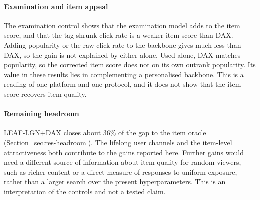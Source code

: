 \paragraph{Examination and item appeal} The examination control shows that the examination model adds to the item score, and that the
tag-shrunk click rate is a weaker item score than DAX. Adding popularity or the raw click rate to the backbone gives much less than DAX, so the gain is not explained by either alone. Used alone, DAX matches popularity, so the corrected item score does not on its own
outrank popularity. Its value in these results lies in complementing a personalised backbone. This is a reading of one platform
and one protocol, and it does not show that the item score recovers item quality.

\paragraph{Remaining headroom} LEAF-LGN+DAX closes about 36\% of the gap to the item oracle (Section~\ref{sec:res-headroom}). The lifelong user
channels and the item-level attractiveness both contribute to the gains reported here. Further gains would need a different source of
information about item quality for random viewers, such as richer content or a direct measure of responses to uniform exposure, rather than a
larger search over the present hyperparameters. This is an interpretation of the controls and not a tested claim.
